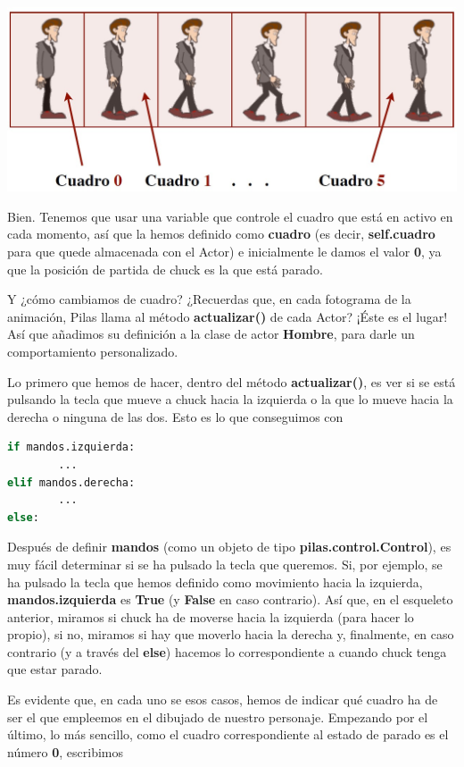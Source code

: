 \documentclass{article}
\begin{document}
\vspace{\baselineskip}
\includegraphics[width=\textwidth]{grilla_numerada}

Bien. Tenemos que usar una variable que controle el cuadro que está en activo en cada momento, así que la hemos definido como \textbf{cuadro} (es decir, \textbf{self.cuadro} para que quede almacenada con el Actor) e inicialmente le damos el valor \textbf{0}, ya que la posición de partida de chuck es la que está parado.\par
Y ¿cómo cambiamos de cuadro? ¿Recuerdas que, en cada fotograma de la animación, Pilas llama al método \textbf{actualizar()} de cada Actor? ¡Éste es el lugar! Así que añadimos su definición a la clase de actor \textbf{Hombre}, para darle un comportamiento personalizado.\par
Lo primero que hemos de hacer, dentro del método \textbf{actualizar()}, es ver si se está pulsando la tecla que mueve a chuck hacia la izquierda o la que lo mueve hacia la derecha o ninguna de las dos. Esto es lo que conseguimos con
\begin{lstlisting}[language=Python]
if mandos.izquierda:
        ...
elif mandos.derecha:
        ...
else:
\end{lstlisting}
\vspace{\baselineskip}

Después de definir \textbf{mandos} (como un objeto de tipo \textbf{pilas.control.Control}), es muy fácil determinar si se ha pulsado la tecla que queremos. Si, por ejemplo, se ha pulsado la tecla que hemos definido como movimiento hacia la izquierda, \textbf{mandos.izquierda} es \textcolor{codepurple}{\textbf{True}} (y \textcolor{codepurple}{\textbf{False}} en caso contrario). Así que, en el esqueleto anterior, miramos si chuck ha de moverse hacia la izquierda (para hacer lo propio), si no, miramos si hay que moverlo hacia la derecha y, finalmente, en caso contrario (y a través del \textcolor{codepurple}{\textbf{else}}) hacemos lo correspondiente a cuando chuck tenga que estar parado.\par
Es evidente que, en cada uno se esos casos, hemos de indicar qué cuadro ha de ser el que empleemos en el dibujado de nuestro personaje. Empezando por el último, lo más sencillo, como el cuadro correspondiente al estado de parado es el número \textbf{0}, escribimos
\end{document}
